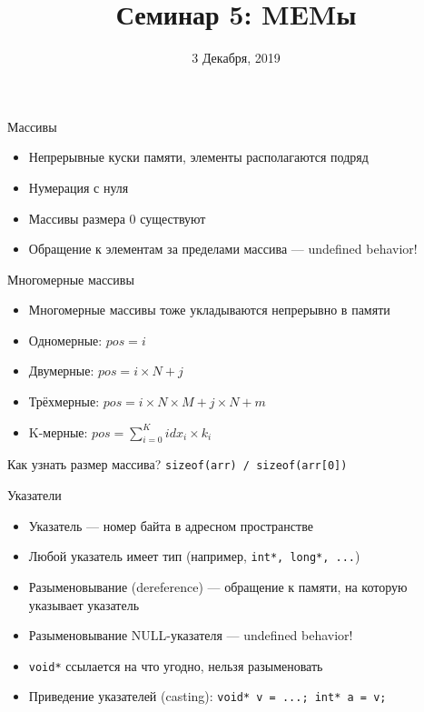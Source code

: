 \documentclass[10pt,pdf,hyperref={unicode}]{beamer}
\title{Семинар 5: MEMы}
\date{3 Декабря, 2019}
\begin{document}
\begin{frame}
  \titlepage
\end{frame}

\begin{frame}{Массивы}
    \begin{itemize}
        \item Непрерывные куски памяти, элементы располагаются подряд
        \item Нумерация с нуля
        \item Массивы размера 0 существуют
        \item Обращение к элементам за пределами массива — undefined behavior!
    \end{itemize}
\end{frame}

\begin{frame}{Многомерные массивы}
    \begin{itemize}
        \item Многомерные массивы тоже укладываются непрерывно в памяти
        \item Одномерные: $pos = i$
        \item Двумерные: $pos = i \times N + j$
        \item Трёхмерные: $pos = i \times N \times M + j \times N + m$
        \item K-мерные: $pos = \sum\limits_{i=0}^K idx_i \times k_i$
    \end{itemize}
\end{frame}

\begin{frame}{Как узнать размер массива?}
    \center\Huge\lstinline{sizeof(arr) / sizeof(arr[0])}
\end{frame}


\begin{frame}{Указатели}
    \begin{itemize}
        \item Указатель — номер байта в адресном пространстве
        \item Любой указатель имеет тип (например, \lstinline{int*, long*, ...})
        \item Разыменовывание (dereference) — обращение к памяти, на которую указывает указатель
        \item Разыменовывание NULL-указателя — undefined behavior!
        \item \lstinline{void*} ссылается на что угодно, нельзя разыменовать
        \item Приведение указателей (casting): \lstinline{void* v = ...; int* a = v;}
    \end{itemize}
\end{frame}
\end{document}
